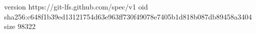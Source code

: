 version https://git-lfs.github.com/spec/v1
oid sha256:c648f1b39ed13121754d63e963ff730f49078e7405b1d818b087db89458a3404
size 98322
